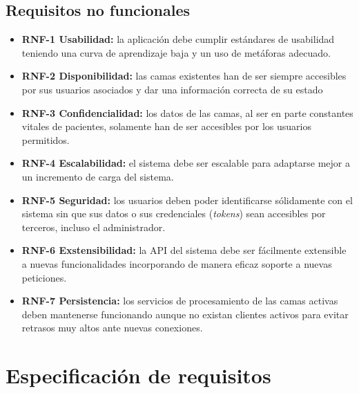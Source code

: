 \subsection{Requisitos no funcionales}\label{requisitos-no-funcionales}
\begin{itemize}
\tightlist
\item
\textbf{RNF-1 Usabilidad:} la aplicación debe cumplir estándares de usabilidad teniendo una curva de aprendizaje baja y un uso de metáforas adecuado.
\item 
\textbf{RNF-2 Disponibilidad:} las camas existentes han de ser siempre accesibles por sus usuarios asociados y dar una información correcta de su estado
\item 
\textbf{RNF-3 Confidencialidad:} los datos de las camas, al ser en parte constantes vitales de pacientes, solamente han de ser accesibles por los usuarios permitidos.
\item
\textbf{RNF-4 Escalabilidad:} el sistema debe ser escalable para adaptarse mejor a un incremento de carga del sistema.
\item 
\textbf{RNF-5 Seguridad:} los usuarios deben poder identificarse sólidamente con el sistema sin que sus datos o sus credenciales (\textit{tokens}) sean accesibles por terceros, incluso el administrador.
\item
\textbf{RNF-6 Exstensibilidad:} la API del sistema debe ser fácilmente extensible a nuevas funcionalidades incorporando de manera eficaz soporte a nuevas peticiones.
\item
\textbf{RNF-7 Persistencia:} los servicios de procesamiento de las camas activas deben mantenerse funcionando aunque no existan clientes activos para evitar retrasos muy altos ante nuevas conexiones.
\end{itemize}

\section{Especificación de requisitos}\label{casos-uso}


